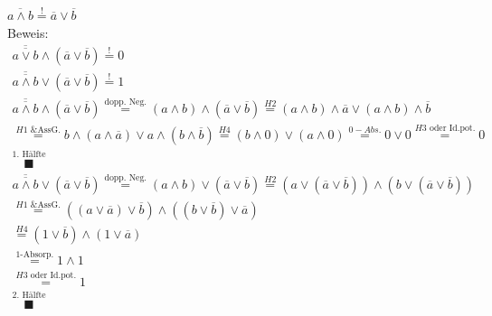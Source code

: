 \documentclass[10pt,a4paper]{scrartcl}
\begin{document}
$ \overline{a \wedge b} \overset{!}{=} \overline{a} \vee \overline{b}$\\
Beweis: 
\begin{align*}
\overline{\overline{a \vee b}}  \wedge (\overline{a} \vee \overline{b}) \overset{!}{=} 0 \\
\overline{\overline{a \wedge b}} \vee (\overline{a} \vee \overline{b}) \overset{!}{=} 1 \\
\overline{\overline{a \wedge b}} \wedge ( \overline{a} \vee \overline{b}) \overset{\text{dopp. Neg.}}{=} (a \wedge b ) \wedge (\overline{a} \vee \overline{b}) \overset{H2}{=} (a \wedge b) \wedge \overline{a} \vee (a \wedge b) \wedge \overline{b} \\
\overset{H1 \text{ \& AssG.}}{=} b \wedge (a \wedge \overline{a}) \vee a \wedge (b \wedge \overline{b}) \overset{H4}{=} (b \wedge 0) \vee (a \wedge 0) \overset{0-Abs.}{=} 0 \vee 0 \overset{H3 \text{ oder Id.pot.}}{=} 0 \\
\overset{\text{1. Hälfte}}{\blacksquare}
\end{align*}
\begin{align*}
\overline{\overline{a \wedge b}} \vee (\overline{a} \vee \overline{b}) \overset{\text{dopp. Neg.}}{=} (a \wedge b) \vee (\overline{a} \vee \overline{b}) \overset{H2}{=} (a \vee (\overline{a} \vee \overline{b})) \wedge (b \vee (\overline{a} \vee \overline{b})) \\
\overset{H1 \text{ \& AssG.}}{=} ((a\vee \overline{a})\vee \overline{b}) \wedge ((b \vee \overline{b})\vee \overline{a})\\
\overset{H4}{=} (1 \vee \overline{b}) \wedge (1 \vee \overline{a})\\
\overset{\text{1-Absorp.}}{=} 1 \wedge 1 \\
\overset{H3 \text{ oder Id.pot.}}{=} 1\\
\overset{\text{2. Hälfte}}{\blacksquare}
\end{align*}
\end{document}
